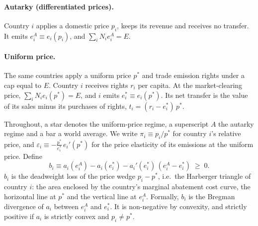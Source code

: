 \documentclass[12pt,english]{article}
\theoremstyle{remark}
\begin{document}
\paragraph{Autarky (differentiated prices).} Country $i$ applies a domestic price $p_i$, keeps its revenue and receives no transfer. It emits $e^A_i \equiv e_i(p_i)$, and $\sum_i N_i e^A_i = E$.

\paragraph{Uniform price.} The same countries apply a uniform price $p^*$ and trade emission rights under a cap equal to $E$.
Country $i$ receives rights $r_i$ per capita. At the market-clearing price, $\sum_i N_i e_i(p^*) = E$,
and $i$ emits $e^*_i \equiv e_i(p^*)$. Its net transfer is the value of its sales minus its purchases of rights, $t_i=(r_i-e^*_i)\,p^*$.

Throughout, a star denotes the uniform-price regime, a superscript $A$ the autarky regime and a bar a world average.
We write $\pi_i \equiv p_i/p^*$ for country $i$'s relative price, and $\varepsilon_i \equiv -\frac{p^*}{e^*_i}\,e_i'(p^*)$ for the price elasticity of its emissions at the uniform price. Define
\begin{equation}
  b_i \equiv a_i(e^A_i) - a_i(e^*_i) - a_i'(e^*_i)\,(e^A_i-e^*_i) \;\geq\; 0.
  \label{eq:bregman}
\end{equation}
$b_i$ is the deadweight loss of the price wedge $p_i - p^*$, i.e.\ the Harberger triangle of country $i$: %
the area enclosed by the country's marginal abatement cost curve, the horizontal line at $p^*$ and the vertical line at $e^A_i$. %
Formally, $b_i$ is the Bregman divergence of $a_i$ between $e^A_i$ and $e^*_i$. It is non-negative by convexity, and strictly positive if $a_i$ is strictly convex and $p_i\neq p^*$.
\end{document}
